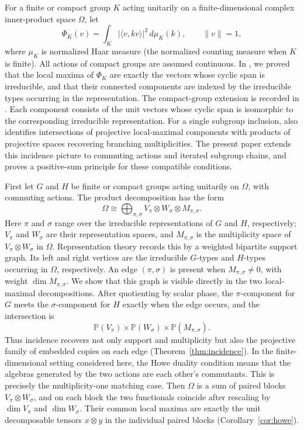 \documentclass[10pt]{amsart}
\theoremstyle{remark}
\newcommand{\PP}{\mathbb P}
\begin{document}
For a finite or compact group $K$ acting unitarily on a finite-dimensional complex inner-product space $\Omega$, let
\[
 \Phi_K(v)=\int_K |\langle v,kv\rangle|^2\,d\mu_K(k),
 \qquad \|v\|=1,
\]
where $\mu_K$ is normalized Haar measure (the normalized counting measure when $K$ is finite).
All actions of compact groups are assumed continuous. In
\cite[Theorem~3 and Corollary~4]{HungKang2026}, we proved that the local maxima of $\Phi_K$ are exactly
the vectors whose cyclic span is irreducible, and that their connected components are indexed by
the irreducible types occurring in the representation. The compact-group extension is recorded in
\cite[Remark~2]{HungKang2026}. Each component consists of the unit vectors whose cyclic span is
isomorphic to the corresponding irreducible representation.
For a single subgroup inclusion, \cite[Theorem~6]{HungKang2026} also identifies intersections of
projective local-maximal components with products of projective spaces recovering branching
multiplicities. The present paper extends this incidence picture to commuting actions and iterated
subgroup chains, and proves a positive-sum principle for these compatible conditions.

First let $G$ and $H$ be finite or compact groups acting unitarily on $\Omega$, with commuting actions.
The product decomposition has the form
\[
 \Omega\cong\bigoplus_{\pi,\sigma}
 V_\pi\otimes W_\sigma\otimes M_{\pi,\sigma}.
\]
Here $\pi$ and $\sigma$ range over the irreducible
representations of $G$ and $H$, respectively;
$V_\pi$ and $W_\sigma$ are their representation spaces,
and $M_{\pi,\sigma}$ is the multiplicity space of
$V_\pi \otimes W_\sigma$ in $\Omega$.
Representation theory records this by a weighted bipartite support graph. Its left and right vertices are the irreducible
$G$-types and $H$-types occurring in $\Omega$, respectively. An edge $(\pi,\sigma)$ is
present when $M_{\pi,\sigma}\ne0$, with weight $\dim M_{\pi,\sigma}$.
We show that this graph is visible
directly in the two local-maximal decompositions. After quotienting by scalar phase, the $\pi$-component
for $G$ meets the $\sigma$-component for $H$ exactly when the edge occurs, and the intersection is
\[
 \PP(V_\pi)\times\PP(W_\sigma)\times\PP(M_{\pi,\sigma}).
\]
Thus incidence recovers not only support and multiplicity but also the projective family of embedded
copies on each edge (Theorem~\ref{thm:incidence}).
In the finite-dimensional setting considered here, the Howe duality condition
\cite{Howe1989a,Howe1989b,GoodmanWallach} means that the algebras generated by the two actions are
each other's commutants. This is precisely the multiplicity-one matching case. Then $\Omega$ is a sum
of paired blocks $V_\pi\otimes W_\sigma$, and on each block the two functionals coincide after
rescaling by $\dim V_\pi$ and $\dim W_\sigma$. Their common local maxima are exactly the unit
decomposable tensors $x\otimes y$ in the individual paired blocks
(Corollary~\ref{cor:howe}).
\end{document}
